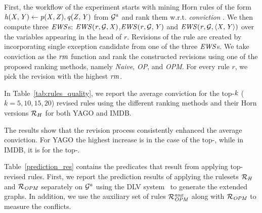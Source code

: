 First, the workflow of the experiment starts with mining Horn rules of the form $\mathit{h(X,Y)\leftarrow p(X,Z),q(Z,Y)}$ from $\mathcal{G}^a$ and rank them w.r.t. %
\textit{conviction} %
\cite{convict}.
We then compute three $\mathit{EWS}$s{:} $\mathit{EWS(r,\mathcal{G},X)}${,}$\mathit{EWS(r,\mathcal{G},Y)}$ and $\mathit{EWS(r,\mathcal{G},\langle X,Y\rangle)}$ over the variables appearing in the head of $r$. Revisions of the rule are created by incorporating single exception candidate from one of the three $\mathit{EWS}$s. We take conviction as the $\mathit{rm}$ function and rank the constructed revisions using one of the proposed ranking methods, namely \emph{Naive}, \emph{OP}, and \emph{OPM}. For every rule $r$, we pick the revision with the highest $\mathit{rm}$.

In Table~\ref{tab:rules_quality}, we report the average conviction for the top-$\mathit{k}$ ($k=5,10,15,20$) revised rules using the different ranking methods and their Horn versions $\mathcal{R}_{H}$ for both YAGO and IMDB. 

The results show that the revision process consistently enhanced the average conviction. For YAGO the highest increase is  in the case of the top-, while in IMDB, it is  for the top-.


Table~\ref{prediction_res} contains the predicates that result from applying top- revised rules. First, we report the prediction results of applying the rulesets $\mathcal{R}_{\mathit{H}}$ and $\mathcal{R}_{\mathit{OPM}}$ separately on $\mathcal{G}^a$ using the DLV system~\cite{dlv} to generate the extended graphs. In addition, we use the auxiliary set of rules $\mathcal{R}_{\mathit{OPM}}^{\mathit{aux}}$ along with  $\mathcal{R}_{\mathit{OPM}}$ to measure the conflicts.

